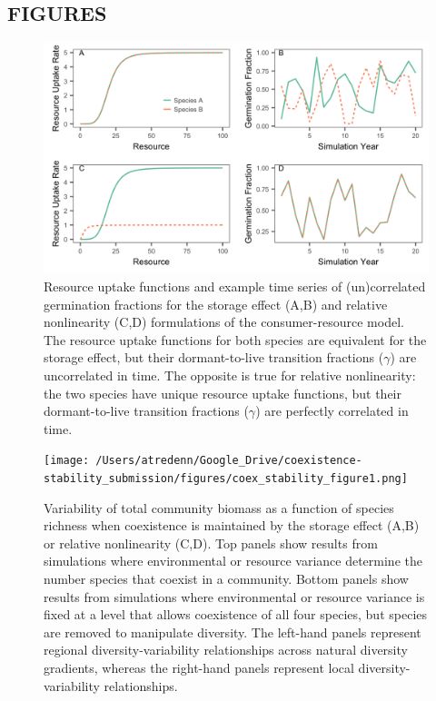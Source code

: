 \documentclass[12pt,]{article}
\begin{document}
\newpage{}

\subsection{FIGURES}\label{figures}

\begin{figure}[htbp]
\centering
\includegraphics{components/figure/manuscript-model_types-1.png}
\caption{Resource uptake functions and example time series of
(un)correlated germination fractions for the storage effect (A,B) and
relative nonlinearity (C,D) formulations of the consumer-resource model.
The resource uptake functions for both species are equivalent for the
storage effect, but their dormant-to-live transition fractions
(\(\gamma\)) are uncorrelated in time. The opposite is true for relative
nonlinearity: the two species have unique resource uptake functions, but
their dormant-to-live transition fractions (\(\gamma\)) are perfectly
correlated in time.}
\end{figure}

\newpage{}

\begin{figure}[!ht]
  \centering
      \texttt{[image: /Users/atredenn/Google\_Drive/coexistence-stability\_submission/figures/coex\_stability\_figure1.png]}
  \caption{Variability of total community biomass as a function of species richness when coexistence is maintained by the storage effect (A,B) or relative nonlinearity (C,D). Top panels show results from simulations where environmental or resource variance determine the number species that coexist in a community. Bottom panels show results from simulations where environmental or resource variance is fixed at a level that allows coexistence of all four species, but species are removed to manipulate diversity. The left-hand panels represent regional diversity-variability relationships across natural diversity gradients, whereas the right-hand panels represent local diversity-variability relationships.}
\end{figure}
\end{document}
